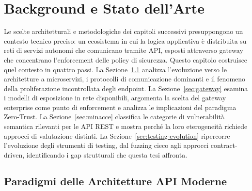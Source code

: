 

\chapter{Background e Stato dell'Arte}\label{chap:background}

Le scelte architetturali e metodologiche dei capitoli successivi presuppongono un contesto tecnico preciso: un ecosistema in cui la logica applicativa è distribuita su reti di servizi autonomi che comunicano tramite \gls{API}, esposti attraverso gateway che concentrano l'enforcement delle policy di sicurezza. Questo capitolo costruisce quel contesto in quattro passi. La Sezione~\ref{sec:paradigmi} analizza l'evoluzione verso le architetture a microservizi, i protocolli di comunicazione dominanti e il fenomeno della proliferazione incontrollata degli endpoint. La Sezione~\ref{sec:gateway} esamina i modelli di esposizione in rete disponibili, argomenta la scelta del gateway enterprise come punto di enforcement e analizza le implicazioni del paradigma Zero-Trust. La Sezione~\ref{sec:minacce} classifica le categorie di vulnerabilità semantica rilevanti per le \gls{API} REST e mostra perché la loro eterogeneità richiede approcci di valutazione distinti. La Sezione~\ref{sec:testing-evolution} ripercorre l'evoluzione degli strumenti di testing, dal fuzzing cieco agli approcci contract-driven, identificando i gap strutturali che questa tesi affronta.


\section{Paradigmi delle Architetture API Moderne}\label{sec:paradigmi}

